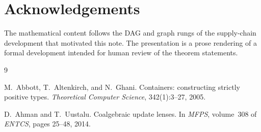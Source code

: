 \documentclass[11pt,a4paper]{article}
\theoremstyle{plain}
\theoremstyle{definition}
\begin{document}
\section*{Acknowledgements}

The mathematical content follows the DAG and graph rungs of the supply-chain
development that motivated this note. The presentation is a prose rendering of
a formal development intended for human review of the theorem statements.

\begin{thebibliography}{9}

M.~Abbott, T.~Altenkirch, and N.~Ghani.
\newblock Containers: constructing strictly positive types.
\newblock \emph{Theoretical Computer Science}, 342(1):3--27, 2005.

D.~Ahman and T.~Uustalu.
\newblock Coalgebraic update lenses.
\newblock In \emph{MFPS}, volume~308 of \emph{ENTCS}, pages 25--48, 2014.

\end{thebibliography}
\end{document}
